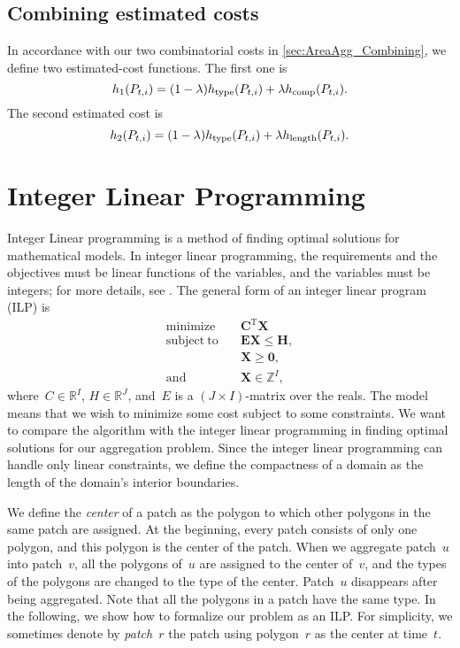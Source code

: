 \subsection{Combining estimated costs}
\label{sec:AreaAgg_CombinationEstimated}
In accordance 
with our two combinatorial costs in 
\sect\ref{sec:AreaAgg_Combining},
we define two estimated-cost functions.
The first one is 
\begin{equation}
\label{eq:h_1}
h_1(P_{t,i})=
(1-\lambda)h_\mathrm{type}(P_{t,i})
+\lambda h_{\mathrm{comp}}(P_{t,i}).
\end{equation}
The second estimated cost is
\begin{equation}
\label{eq:h_2}
h_2(P_{t,i})=
(1-\lambda)h_\mathrm{type}(P_{t,i})
+\lambda h_{\mathrm{length}}(P_{t,i}).
\end{equation}





\section{Integer Linear Programming}
\label{sec:AreaAgg_ILP}

Integer Linear programming is a method 
of finding optimal solutions for mathematical models.
In integer linear programming, 
the requirements and the objectives must be 
linear functions of the variables, 
and the variables must be integers; 
for more details, see 
\textcite[chapter~13]{Papadimitriou1982combinatorial}.
The general form of an integer linear program (ILP) is
\begin{align*} 
\mathrm{minimize} 	\quad	 & \bm{C}^\mathrm{T}\bm{X}  \\
\mathrm{subject~to} \quad	 & \bm{EX \le H}, \\
							 & \bm{X}\ge \bm{0}, \\
\mathrm{and} 		\quad	 & \bm{X} \in \mathbb{Z}^I,
\end{align*}
where~$C \in \mathbb{R}^I$, $H \in \mathbb{R}^J$,
and~$E$ is a $(J \times I)$-matrix over the reals.
The model means that 
we wish to minimize some cost subject to some constraints.
We want to compare the \Astar algorithm with 
the integer linear programming in finding 
optimal solutions for our aggregation problem. 
Since the integer linear programming
can handle only linear constraints, 
we define the compactness of a domain as 
the length of the domain's interior boundaries.

We define the \emph{center} of a patch as the polygon 
to which other polygons in the same patch are assigned. 
At the beginning, every patch consists of only one polygon, 
and this polygon is the center of the patch.
When we aggregate patch~$u$ into patch~$v$, 
all the polygons of~$u$ are assigned to the center of~$v$,
and the types of the polygons are changed to the type of the 
center.
Patch~$u$ disappears after being aggregated.
Note that all the polygons in a patch have the same type.
In the following, we show how to formalize our problem 
as an ILP.
For simplicity, we sometimes denote by \emph{patch~$r$} the 
patch using polygon~$r$ as the center at time~$t$.


